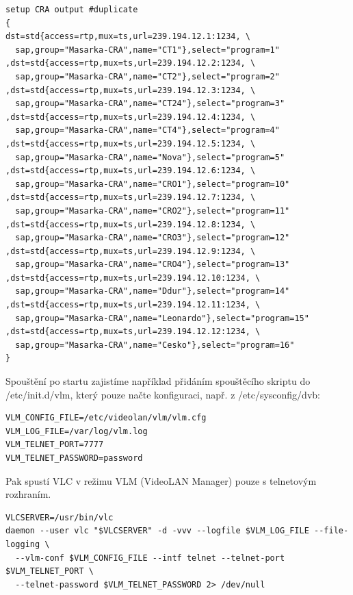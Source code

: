 \begin{small}
\begin{verbatim}
setup CRA output #duplicate
{
dst=std{access=rtp,mux=ts,url=239.194.12.1:1234, \
  sap,group="Masarka-CRA",name="CT1"},select="program=1"
,dst=std{access=rtp,mux=ts,url=239.194.12.2:1234, \
  sap,group="Masarka-CRA",name="CT2"},select="program=2"
,dst=std{access=rtp,mux=ts,url=239.194.12.3:1234, \ 
  sap,group="Masarka-CRA",name="CT24"},select="program=3"
,dst=std{access=rtp,mux=ts,url=239.194.12.4:1234, \
  sap,group="Masarka-CRA",name="CT4"},select="program=4"
,dst=std{access=rtp,mux=ts,url=239.194.12.5:1234, \
  sap,group="Masarka-CRA",name="Nova"},select="program=5"
,dst=std{access=rtp,mux=ts,url=239.194.12.6:1234, \
  sap,group="Masarka-CRA",name="CRO1"},select="program=10"
,dst=std{access=rtp,mux=ts,url=239.194.12.7:1234, \
  sap,group="Masarka-CRA",name="CRO2"},select="program=11"
,dst=std{access=rtp,mux=ts,url=239.194.12.8:1234, \
  sap,group="Masarka-CRA",name="CRO3"},select="program=12"
,dst=std{access=rtp,mux=ts,url=239.194.12.9:1234, \
  sap,group="Masarka-CRA",name="CRO4"},select="program=13"
,dst=std{access=rtp,mux=ts,url=239.194.12.10:1234, \
  sap,group="Masarka-CRA",name="Ddur"},select="program=14"
,dst=std{access=rtp,mux=ts,url=239.194.12.11:1234, \
  sap,group="Masarka-CRA",name="Leonardo"},select="program=15"
,dst=std{access=rtp,mux=ts,url=239.194.12.12:1234, \
  sap,group="Masarka-CRA",name="Cesko"},select="program=16"
}
\end{verbatim}
\end{small}

Spouštění po startu zajistíme například přidáním spouštěcího skriptu do /etc/init.d/vlm, který pouze načte konfiguraci, např. z /etc/sysconfig/dvb:

\begin{small}
\begin{verbatim}
VLM_CONFIG_FILE=/etc/videolan/vlm/vlm.cfg
VLM_LOG_FILE=/var/log/vlm.log
VLM_TELNET_PORT=7777
VLM_TELNET_PASSWORD=password
\end{verbatim}
\end{small}

\pagebreak
Pak spustí VLC v režimu VLM (VideoLAN Manager) pouze s telnetovým rozhraním.

\begin{small}
\begin{verbatim}
VLCSERVER=/usr/bin/vlc
daemon --user vlc "$VLCSERVER" -d -vvv --logfile $VLM_LOG_FILE --file-logging \
  --vlm-conf $VLM_CONFIG_FILE --intf telnet --telnet-port $VLM_TELNET_PORT \
  --telnet-password $VLM_TELNET_PASSWORD 2> /dev/null
\end{verbatim}
\end{small}

